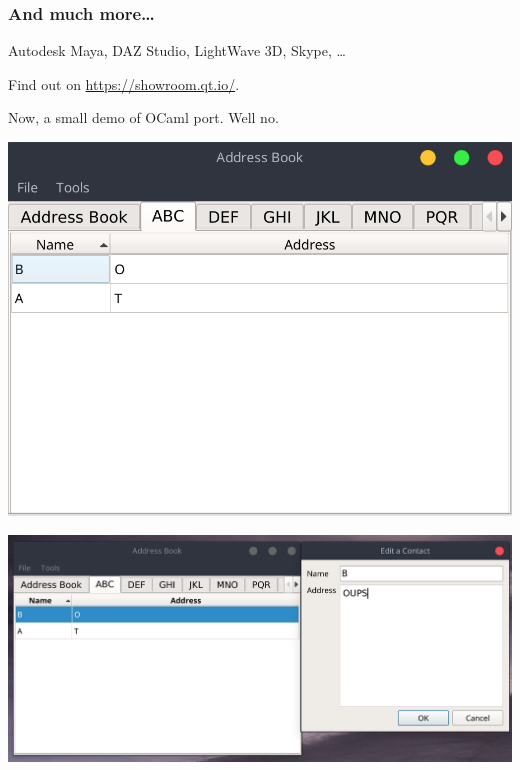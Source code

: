 \begin{frame}
  \frametitle{And much more\ldots}
  Autodesk Maya, DAZ Studio, LightWave 3D, Skype, \ldots
  \bigskip

  Find out on \href{https://showroom.qt.io/}{https://showroom.qt.io/}. \pause
  \bigskip

  Now, a small demo of OCaml port.
  \pause
  Well no.

\end{frame}

\begin{frame}
  \includegraphics[width=\textwidth]{address_main}
\end{frame}

\begin{frame}
  \includegraphics[width=\textwidth]{address_edit}
\end{frame}

